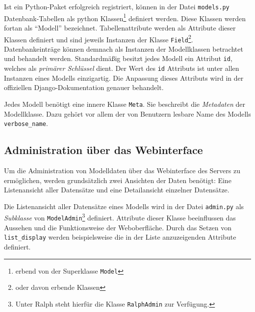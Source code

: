 Ist ein Python-Paket erfolgreich registriert, können in der Datei
\texttt{models.py} Datenbank-Tabellen als python Klassen\footnote{erbend
  von der Superklasse \texttt{Model}\cite{django-doku-models}} definiert
werden. Diese Klassen werden fortan als ``Modell'' bezeichnet.
Tabellenattribute werden als Attribute dieser Klassen definiert und sind
jeweils Instanzen der Klasse
\texttt{Field}\cite{django-doku-models}\footnote{oder davon erbende
  Klassen}. Datenbankeinträge können demnach als Instanzen der
Modellklassen betrachtet und behandelt werden. Standardmäßig besitzt
jedes Modell ein Attribut \texttt{id}, welches als
\emph{primärer Schlüssel}
dient. Der Wert des \texttt{id} Attributs ist unter allen Instanzen
eines Modells einzigartig. Die Anpassung dieses Attributs wird in der
offiziellen Django-Dokumentation genauer behandelt.
\cite{django-doku-models}

Jedes Modell benötigt eine innere Klasse \texttt{Meta}. Sie beschreibt
die
\emph{Metadaten}
der Modellklasse. Dazu gehört vor allem der von Benutzern lesbare Name
des Modells \texttt{verbose\_name}. \cite{django-doku-models-options}

\hypertarget{administration-uxfcber-das-webinterface}{%
\subsection{Administration über das
Webinterface}\label{administration-uxfcber-das-webinterface}}

Um die Administration von Modelldaten über das Webinterface des Servers
zu ermöglichen, werden grundsätzlich zwei Ansichten der Daten benötigt:
Eine Listenansicht aller Datensätze und eine Detailansicht einzelner
Datensätze.

Die Listenansicht aller Datensätze eines Modells wird in der Datei
\texttt{admin.py} als
\emph{Subklasse}
von \texttt{ModelAdmin}\footnote{Unter Ralph steht hierfür die Klasse
  \texttt{RalphAdmin} zur Verfügung.\cite{ralph-admin-doku}} definiert.
Attribute dieser Klasse beeinflussen das Aussehen und die Funktionsweise
der Weboberfläche. Durch das Setzen von \texttt{list\_display} werden
beispielsweise die in der Liste anzuzeigenden Attribute definiert.

